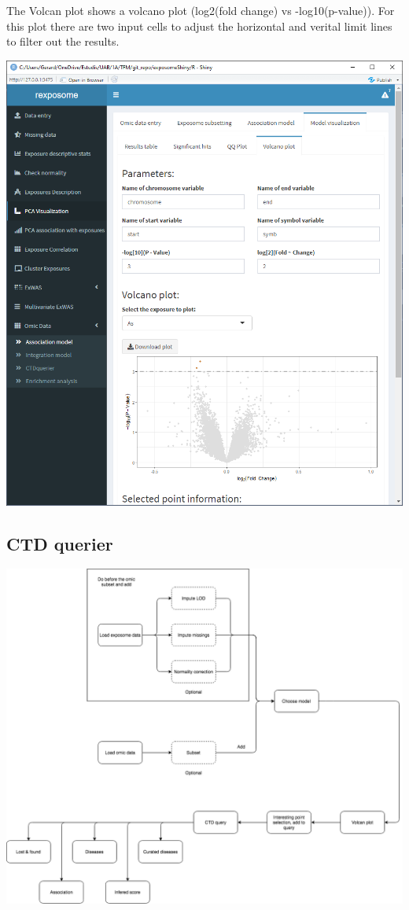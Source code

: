 \documentclass[
]{book}
\begin{document}
The Volcan plot shows a volcano plot (log2(fold change) vs -log10(p-value)). For this plot there are two input cells to adjust the horizontal and verital limit lines to filter out the results.

\includegraphics{images/analysis9_8.png}

\hypertarget{ctd-querier}{%
\subsection{CTD querier}\label{ctd-querier}}

\includegraphics{images/analysis10_1.png}
\end{document}
